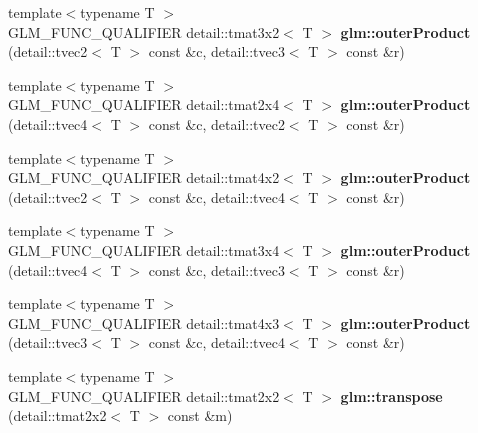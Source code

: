 \begin{DoxyCompactItemize}
\item 
\hypertarget{namespaceglm_af3835ed91b031947048595312d2bc387}{}{\footnotesize template$<$typename T $>$ }\\G\+L\+M\+\_\+\+F\+U\+N\+C\+\_\+\+Q\+U\+A\+L\+I\+F\+I\+E\+R detail\+::tmat3x2$<$ T $>$ {\bfseries glm\+::outer\+Product} (detail\+::tvec2$<$ T $>$ const \&c, detail\+::tvec3$<$ T $>$ const \&r)\label{namespaceglm_af3835ed91b031947048595312d2bc387}

\item 
\hypertarget{namespaceglm_a7c2cdc0bd949ec6907e8c28e22059f01}{}{\footnotesize template$<$typename T $>$ }\\G\+L\+M\+\_\+\+F\+U\+N\+C\+\_\+\+Q\+U\+A\+L\+I\+F\+I\+E\+R detail\+::tmat2x4$<$ T $>$ {\bfseries glm\+::outer\+Product} (detail\+::tvec4$<$ T $>$ const \&c, detail\+::tvec2$<$ T $>$ const \&r)\label{namespaceglm_a7c2cdc0bd949ec6907e8c28e22059f01}

\item 
\hypertarget{namespaceglm_a45ad2846226667a7912f3675eadb71f5}{}{\footnotesize template$<$typename T $>$ }\\G\+L\+M\+\_\+\+F\+U\+N\+C\+\_\+\+Q\+U\+A\+L\+I\+F\+I\+E\+R detail\+::tmat4x2$<$ T $>$ {\bfseries glm\+::outer\+Product} (detail\+::tvec2$<$ T $>$ const \&c, detail\+::tvec4$<$ T $>$ const \&r)\label{namespaceglm_a45ad2846226667a7912f3675eadb71f5}

\item 
\hypertarget{namespaceglm_a89c4470ff5ee964466f48d7a2810de30}{}{\footnotesize template$<$typename T $>$ }\\G\+L\+M\+\_\+\+F\+U\+N\+C\+\_\+\+Q\+U\+A\+L\+I\+F\+I\+E\+R detail\+::tmat3x4$<$ T $>$ {\bfseries glm\+::outer\+Product} (detail\+::tvec4$<$ T $>$ const \&c, detail\+::tvec3$<$ T $>$ const \&r)\label{namespaceglm_a89c4470ff5ee964466f48d7a2810de30}

\item 
\hypertarget{namespaceglm_ae113cac3852e7e6087aa1a275d8d88b8}{}{\footnotesize template$<$typename T $>$ }\\G\+L\+M\+\_\+\+F\+U\+N\+C\+\_\+\+Q\+U\+A\+L\+I\+F\+I\+E\+R detail\+::tmat4x3$<$ T $>$ {\bfseries glm\+::outer\+Product} (detail\+::tvec3$<$ T $>$ const \&c, detail\+::tvec4$<$ T $>$ const \&r)\label{namespaceglm_ae113cac3852e7e6087aa1a275d8d88b8}

\item 
\hypertarget{namespaceglm_a5c06983680df715f2ca2ade44551d8cd}{}{\footnotesize template$<$typename T $>$ }\\G\+L\+M\+\_\+\+F\+U\+N\+C\+\_\+\+Q\+U\+A\+L\+I\+F\+I\+E\+R detail\+::tmat2x2$<$ T $>$ {\bfseries glm\+::transpose} (detail\+::tmat2x2$<$ T $>$ const \&m)\label{namespaceglm_a5c06983680df715f2ca2ade44551d8cd}


\end{DoxyCompactItemize}

